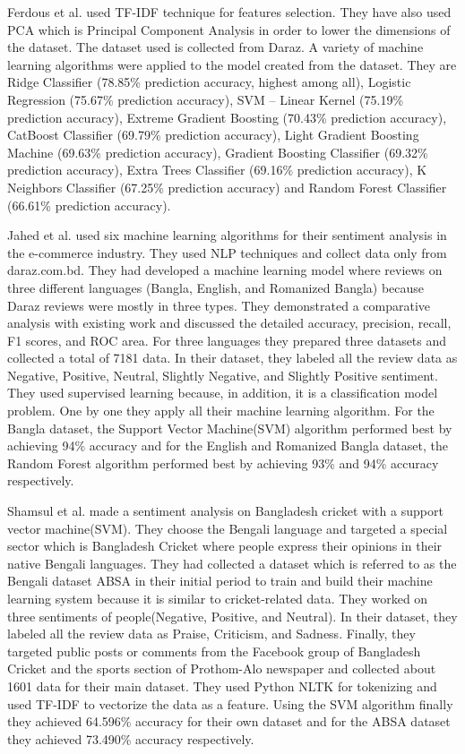 \documentclass[conference]{IEEEtran}
\begin{document}
Ferdous et al. \cite{b4} used TF-IDF technique for features selection. They have also used PCA which is Principal Component Analysis in order to lower the dimensions of the dataset. The dataset used is collected from Daraz. A variety of machine learning algorithms were applied to the model created from the dataset. They are Ridge Classifier (78.85\% prediction accuracy, highest among all), Logistic Regression (75.67\% prediction accuracy), SVM – Linear Kernel (75.19\% prediction accuracy), Extreme Gradient Boosting (70.43\% prediction accuracy), CatBoost Classifier (69.79\% prediction accuracy), Light Gradient Boosting Machine (69.63\% prediction accuracy), Gradient Boosting Classifier (69.32\% prediction accuracy), Extra Trees Classifier (69.16\% prediction accuracy), K Neighbors Classifier (67.25\% prediction accuracy) and Random Forest Classifier (66.61\% prediction accuracy).
\par   
Jahed et al.\cite{b5} used six machine learning algorithms for their sentiment analysis in the e-commerce industry. They used NLP techniques and collect data only from daraz.com.bd. They had developed a machine learning model where reviews on three different languages (Bangla, English, and Romanized Bangla) because Daraz reviews were mostly in three types. They demonstrated a comparative analysis with existing work and discussed the detailed accuracy, precision, recall, F1 scores, and ROC area. For three languages they prepared three datasets and collected a total of 7181 data. In their dataset, they labeled all the review data as Negative, Positive, Neutral, Slightly Negative, and Slightly Positive sentiment. They used supervised learning because, in addition, it is a classification model problem. One by one they apply all their machine learning algorithm. For the Bangla dataset, the Support Vector Machine(SVM) algorithm performed best by achieving 94\% accuracy and for the English and Romanized Bangla dataset, the Random Forest algorithm performed best by achieving 93\% and 94\% accuracy respectively.
\par
Shamsul et al.\cite{b6} made a sentiment analysis on Bangladesh cricket with a support vector machine(SVM). They choose the Bengali language and targeted a special sector which is Bangladesh Cricket where people express their opinions in their native Bengali languages. They had collected a dataset which is referred to as the Bengali dataset ABSA in their initial period to train and build their machine learning system because it is similar to cricket-related data. They worked on three sentiments of people(Negative, Positive, and Neutral). In their dataset, they labeled all the review data as Praise, Criticism, and Sadness. Finally, they targeted public posts or comments from the Facebook group of Bangladesh Cricket and the sports section of Prothom-Alo newspaper and collected about 1601 data for their main dataset. They used Python NLTK for tokenizing and used TF-IDF to vectorize the data as a feature. Using the SVM algorithm finally they achieved 64.596\% accuracy for their own dataset and for the ABSA dataset they achieved 73.490\% accuracy respectively. 
\end{document}
